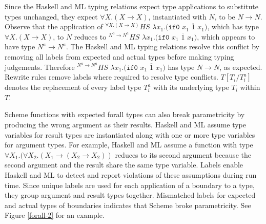 

Since the Haskell and ML typing relations expect type applications to substitute types unchanged, they expect $\forall X.(X\rightarrow X)$, instantiated with $N$, to be $N\rightarrow N$.  Observe that the application of $^{\forall X.(X\rightarrow X)}HS$ $\lambda x_{1}.(\mathtt{if0}$ $x_{1}$ $\overline{1}$ $x_{1})$, which has type $\forall X.(X\rightarrow X)$, to $N$ reduces to $^{N^{a}\rightarrow N^{a}}HS$ $\lambda x_{1}.(\mathtt{if0}$ $x_{1}$ $\overline{1}$ $x_{1})$, which appears to have type $N^{a}\rightarrow N^{a}$.  The Haskell and ML typing relations resolve this conflict by removing all labels from expected and actual types before making typing judgements.  Therefore $^{N^{a}\rightarrow N^{a}}HS$ $\lambda x_{1}.(\mathtt{if0}$ $x_{1}$ $\overline{1}$ $x_{1})$ has type $N\rightarrow N$, as expected.  Rewrite rules remove labels where required to resolve type conflicts.  $T[T_{i}/T_{i}^{a}]$ denotes the replacement of every label type $T_{i}^{a}$ with its underlying type $T_{i}$ within $T$.

Scheme functions with expected forall types can also break parametricity by producing the wrong argument as their results.  Haskell and ML assume type variables for result types are instantiated along with one or more type variables for argument types.  For example, Haskell and ML assume a function with type $\forall X_{1}.(\forall X_{2}.(X_{1}\rightarrow(X_{2}\rightarrow X_{2}))$ reduces to its second argument because the second argument and the result share the same type variable.  Labels enable Haskell and ML to detect and report violations of these assumptions during run time.  Since unique labels are used for each application of a boundary to a type, they group argument and result types together.  Mismatched labels for expected and actual types of boundaries indicates that Scheme broke parametricity.  See Figure \ref{forall-2} for an example.



